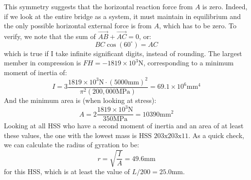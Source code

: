 \documentclass{article}
\begin{document}
    This symmetry suggests that the horizontal reaction force from $A$ is zero. Indeed, if we look at the entire bridge as a system, it must maintain in equilibrium and the only possible horizontal external force is from $A$, which has to be zero. To verify, we note that the sum of $\vec{AB}+\vec{AC}=0$, or:
    \begin{equation}
        BC\cos(60^\circ) = AC
        \label{eq:}
    \end{equation}
    which is true if I take infinite significant digits, instead of rounding. The largest member in compression is $FH=-1819\times 10^3 \si{\newton}$, corresponding to a minimum moment of inertia of:
    \begin{equation}
        I = 3\frac{1819\times 10^3 \si{\newton} \cdot (5000 \si{\milli\meter})^2}{\pi^2 (200,000\si{\mega\pascal})} = 69.1 \times 10^6 \si{\milli\meter\tothe{4}}
        \label{eq:}
    \end{equation}
    And the minimum area is (when looking at stress):
    \begin{equation}
        A = 2\frac{1819\times 10^3\si{\newton}}{350\si{\mega\pascal}} = 10390\si{\milli\meter\squared}
    \end{equation}
    Looking at all HSS who have a second moment of inertia and an area of at least these values, the one with the lowest mass is $\boxed{\text{HSS 203x203x11}}$. As a quick check, we can calculate the radius of gyration to be:
    \begin{equation}
        r = \sqrt{\frac{I}{A}}=49.6\si{\milli\meter}
        \label{eq:}
    \end{equation}
    for this HSS, which is at least the value of $L/200=25.0\si{\milli\meter}$.

\newpage
\end{document}
